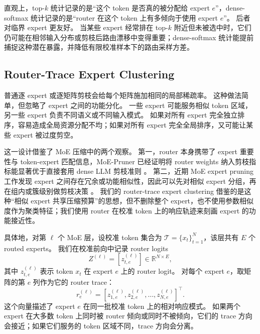 \documentclass[letterpaper]{article}
\begin{document}
直观上，top-$k$ 统计记录的是“这个 token 是否真的被分配给 expert $e$”，dense-softmax 统计记录的是“router 在这个 token 上有多倾向于使用 expert $e$”。
后者对临界 expert 更友好。
当某些 expert 经常排在 top-$k$ 附近但未被选中时，它们仍可能在相邻输入分布或剪枝后路由漂移中变得重要；dense-softmax 统计能提前捕捉这种潜在暴露，并降低有限校准样本下的路由采样方差。

\subsection{Router-Trace Expert Clustering}

普通逐 expert 或逐矩阵剪枝会给每个矩阵施加相同的局部稀疏率。
这种做法简单，但忽略了 expert 之间的功能分化。
一些 expert 可能服务相似 token 区域，另一些 expert 负责不同语义或不同输入模式。
如果对所有 expert 完全独立排序，容易造成全局资源分配不均；如果对所有 expert 完全全局排序，又可能让某些 expert 被过度剪空。

这一设计借鉴了 MoE 压缩中的两个观察。
第一，router 本身携带了 expert 重要性与 token-expert 匹配信息，MoE-Pruner 已经证明将 router weights 纳入剪枝指标能显著优于直接套用 dense LLM 剪枝准则 \cite{moepruner2024}。
第二，近期 MoE expert pruning 工作发现 expert 之间存在冗余或功能相似性，因此可以先对相似 expert 分组，再在组内或簇级别做剪枝决策 \cite{zhang2025diversifying,guo2025cprune}。
我们的 router-trace expert clustering 借鉴的是这种“相似 expert 共享压缩预算”的思想，但不删除整个 expert，也不使用参数相似度作为聚类特征；我们使用 router 在校准 token 上的响应轨迹来刻画 expert 的功能接近性。

具体地，对第 $\ell$ 个 MoE 层，设校准 token 集合为 $\mathcal{T}=\{x_t\}_{t=1}^{N}$，该层共有 $E$ 个 routed experts。
我们在校准前向中记录 router logits
\begin{equation}
    Z^{(\ell)}
    =
    \left[z^{(\ell)}_{t,e}\right]
    \in \mathbb{R}^{N\times E},
\end{equation}
其中 $z^{(\ell)}_{t,e}$ 表示 token $x_t$ 在 expert $e$ 上的 router logit。
对每个 expert $e$，取矩阵的第 $e$ 列作为它的 router trace：
\begin{equation}
    r^{(\ell)}_e
    =
    \left[
    z^{(\ell)}_{1,e},
    z^{(\ell)}_{2,e},
    \ldots,
    z^{(\ell)}_{N,e}
    \right]^\top .
\end{equation}
这个向量描述了 expert $e$ 在同一批校准 token 上的相对响应模式。
如果两个 expert 在大多数 token 上同时被 router 倾向或同时不被倾向，它们的 trace 方向会接近；如果它们服务的 token 区域不同，trace 方向会分离。
\end{document}
